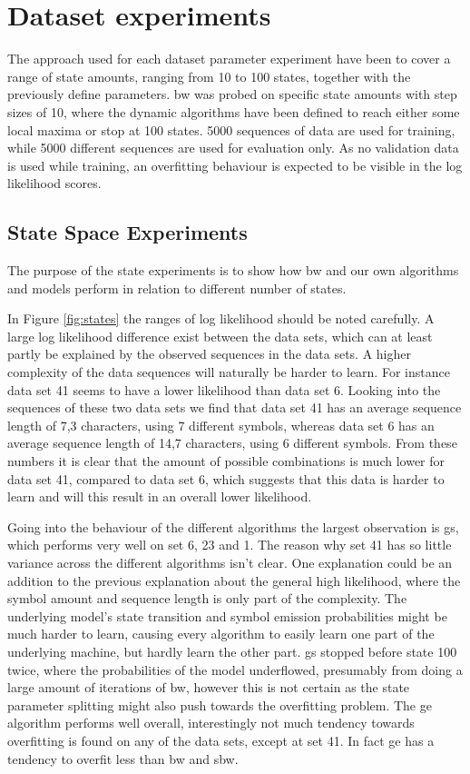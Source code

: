 \section{Dataset experiments}
\label{sec:dataset_experiments}
The approach used for each dataset parameter experiment have been to cover a range of state amounts, ranging from 10 to 100 states, together with the previously define parameters. \gls{bw} was probed on specific state amounts with step sizes of 10, where the dynamic algorithms have been defined to reach either some local maxima or stop at 100 states. 5000 sequences of data are used for training, while 5000 different sequences are used for evaluation only. As no validation data is used while training, an overfitting behaviour is expected to be visible in the log likelihood scores.

\subsection{State Space Experiments}

The purpose of the state experiments is to show how \gls{bw} and our own algorithms and models perform in relation to different number of states.

In Figure \ref{fig:states} the ranges of log likelihood should be noted carefully. A large log likelihood difference exist between the data sets, which can at least partly be explained by the observed sequences in the data sets. A higher complexity of the data sequences will naturally be harder to learn. For instance data set 41 seems to have a lower likelihood than data set 6. Looking into the sequences of these two data sets we find that data set 41 has an average sequence length of 7,3 characters, using 7 different symbols, whereas data set 6 has an average sequence length of 14,7 characters, using 6 different symbols. From these numbers it is clear that the amount of possible combinations is much lower for data set 41, compared to data set 6, which suggests that this data is harder to learn and will this result in an overall lower likelihood.

Going into the behaviour of the different algorithms the largest observation is \gls{gs}, which performs very well on set 6, 23 and 1. The reason why set 41 has so little variance across the different algorithms isn't clear. One explanation could be an addition to the previous explanation about the general high likelihood, where the symbol amount and sequence length is only part of the complexity. The underlying model's state transition and symbol emission probabilities might be much harder to learn, causing every algorithm to easily learn one part of the underlying machine, but hardly learn the other part. \gls{gs} stopped before state 100 twice, where the probabilities of the model underflowed, presumably from doing a large amount of iterations of \gls{bw}, however this is not certain as the state parameter splitting might also push towards the overfitting problem.
The \gls{ge} algorithm performs well overall, interestingly not much tendency towards overfitting is found on any of the data sets, except at set 41. In fact \gls{ge} has a tendency to overfit less than \gls{bw} and \gls{sbw}.

